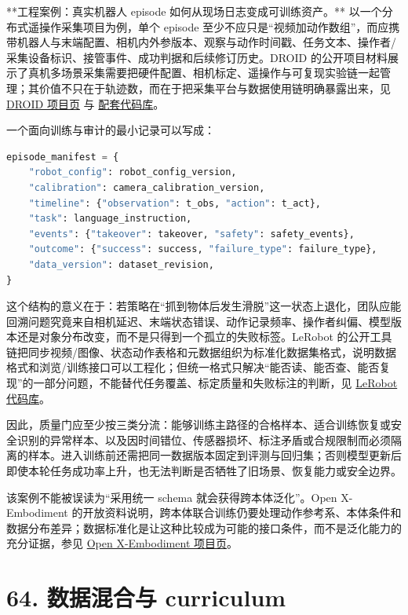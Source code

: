 **工程案例：真实机器人 episode 如何从现场日志变成可训练资产。** 以一个分布式遥操作采集项目为例，单个 episode 至少不应只是“视频加动作数组”，而应携带机器人与末端配置、相机内外参版本、观察与动作时间戳、任务文本、操作者/采集设备标识、接管事件、成功判据和后续修订历史。DROID 的公开项目材料展示了真机多场景采集需要把硬件配置、相机标定、遥操作与可复现实验链一起管理；其价值不只在于轨迹数，而在于把采集平台与数据使用链明确暴露出来，见 \href{https://droid-dataset.github.io/}{DROID 项目页} 与 \href{https://github.com/droid-dataset/droid}{配套代码库}。

一个面向训练与审计的最小记录可以写成：

\begin{lstlisting}[language=python]
episode_manifest = {
    "robot_config": robot_config_version,
    "calibration": camera_calibration_version,
    "timeline": {"observation": t_obs, "action": t_act},
    "task": language_instruction,
    "events": {"takeover": takeover, "safety": safety_events},
    "outcome": {"success": success, "failure_type": failure_type},
    "data_version": dataset_revision,
}
\end{lstlisting}

这个结构的意义在于：若策略在“抓到物体后发生滑脱”这一状态上退化，团队应能回溯问题究竟来自相机延迟、末端状态错误、动作记录频率、操作者纠偏、模型版本还是对象分布改变，而不是只得到一个孤立的失败标签。LeRobot 的公开工具链把同步视频/图像、状态动作表格和元数据组织为标准化数据集格式，说明数据格式和浏览/训练接口可以工程化；但统一格式只解决“能否读、能否查、能否复现”的一部分问题，不能替代任务覆盖、标定质量和失败标注的判断，见 \href{https://github.com/huggingface/lerobot}{LeRobot 代码库}。

因此，质量门应至少按三类分流：能够训练主路径的合格样本、适合训练恢复或安全识别的异常样本、以及因时间错位、传感器损坏、标注矛盾或合规限制而必须隔离的样本。进入训练前还需把同一数据版本固定到评测与回归集；否则模型更新后即使本轮任务成功率上升，也无法判断是否牺牲了旧场景、恢复能力或安全边界。

该案例不能被误读为“采用统一 schema 就会获得跨本体泛化”。Open X-Embodiment 的开放资料说明，跨本体联合训练仍要处理动作参考系、本体条件和数据分布差异；数据标准化是让这种比较成为可能的接口条件，而不是泛化能力的充分证据，参见 \href{https://robotic-transformer-x.github.io/}{Open X-Embodiment 项目页}。

\section*{64. 数据混合与 curriculum}

